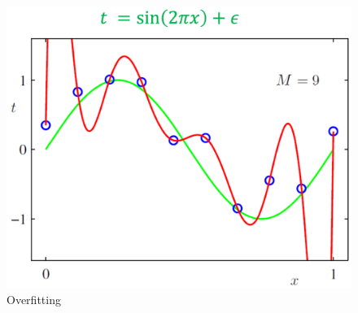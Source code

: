 \begin{figure}[htb]
	\begin{center}
		\includegraphics[width=0.4\linewidth]{bilder/overfit.png}
		\caption{Overfitting}\label{fig:overfit}
	\end{center}
\end{figure}
